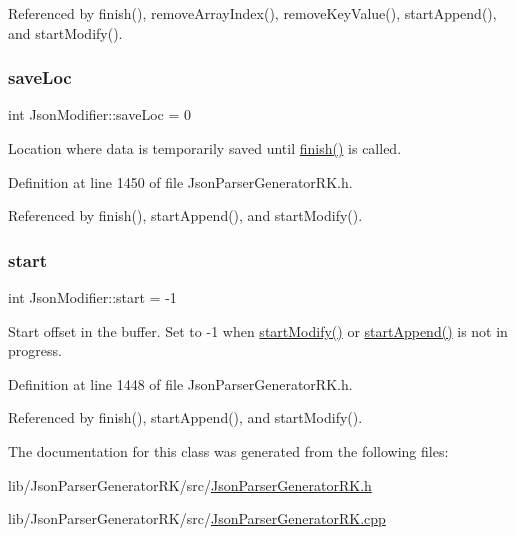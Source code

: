 Referenced by finish(), remove\+Array\+Index(), remove\+Key\+Value(), start\+Append(), and start\+Modify().

\mbox{\label{class_json_modifier_a7ea53418d660ce7cdec0964cca76015b}} 
\subsubsection{\texorpdfstring{save\+Loc}{saveLoc}}
{\footnotesize\ttfamily int Json\+Modifier\+::save\+Loc = 0\hspace{0.3cm}{\ttfamily [protected]}}



Location where data is temporarily saved until \hyperlink{class_json_modifier_ae531232fa98f72eea8ea6ba07c065497}{finish()} is called. 



Definition at line 1450 of file Json\+Parser\+Generator\+R\+K.\+h.



Referenced by finish(), start\+Append(), and start\+Modify().

\mbox{\label{class_json_modifier_abd83b67763dc4ce55562bbdd5cea1e20}} 
\subsubsection{\texorpdfstring{start}{start}}
{\footnotesize\ttfamily int Json\+Modifier\+::start = -\/1\hspace{0.3cm}{\ttfamily [protected]}}



Start offset in the buffer. Set to -\/1 when \hyperlink{class_json_modifier_aa53d66feb3cd13165f3a2eac012a123b}{start\+Modify()} or \hyperlink{class_json_modifier_ab5bf356377a71120588413a4be998607}{start\+Append()} is not in progress. 



Definition at line 1448 of file Json\+Parser\+Generator\+R\+K.\+h.



Referenced by finish(), start\+Append(), and start\+Modify().



The documentation for this class was generated from the following files\+:\begin{DoxyCompactItemize}
\item 
lib/\+Json\+Parser\+Generator\+R\+K/src/\hyperlink{_json_parser_generator_r_k_8h}{Json\+Parser\+Generator\+R\+K.\+h}\item 
lib/\+Json\+Parser\+Generator\+R\+K/src/\hyperlink{_json_parser_generator_r_k_8cpp}{Json\+Parser\+Generator\+R\+K.\+cpp}\end{DoxyCompactItemize}
